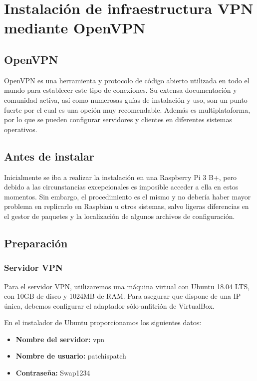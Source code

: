 \documentclass[11pt,a4paper]{article}
\begin{document}
\section{Instalación de infraestructura VPN mediante OpenVPN}

\subsection{OpenVPN}

OpenVPN es una herramienta y protocolo de código abierto utilizada en todo el mundo para establecer este tipo de conexiones. Su extensa documentación y comunidad activa, así como numerosas guías de instalación y uso, son un punto fuerte por el cual es una opción muy recomendable. Además es multiplataforma, por lo que se pueden configurar servidores y clientes en diferentes sistemas operativos.

\subsection{Antes de instalar}

Inicialmente se iba a realizar la instalación en una Raspberry Pi 3 B+, pero debido a las circunstancias excepcionales es imposible acceder a ella en estos momentos. Sin embargo, el procedimiento es el mismo y no debería haber mayor problema en replicarlo en Raspbian u otros sistemas, salvo ligeras diferencias en el gestor de paquetes y la localización de algunos archivos de configuración.

\subsection{Preparación}

\subsubsection{Servidor VPN}

Para el servidor VPN, utilizaremos una máquina virtual con Ubuntu 18.04 LTS, con 10GB de disco y 1024MB de RAM. Para asegurar que dispone de una IP única, debemos configurar el adaptador sólo-anfitrión de VirtualBox.

\medskip

En el instalador de Ubuntu proporcionamos los siguientes datos:

\begin{itemize}
\item \textbf{Nombre del servidor:} vpn
\item \textbf{Nombre de usuario:} patchispatch
\item \textbf{Contraseña:} Swap1234
\end{itemize}
\end{document}
